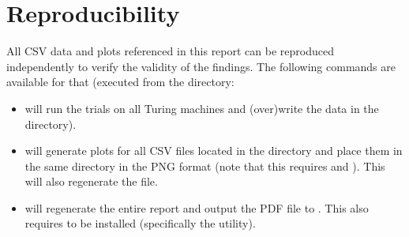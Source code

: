 \section{Reproducibility}

All CSV data and plots referenced in this report can be reproduced independently to verify the validity of the findings. The following commands are available for that (executed from the  directory:

\begin{itemize}
    \item {} will run the trials on all Turing machines and (over)write the data in the  directory).
    \item {} will generate plots for all CSV files located in the  directory and place them in the same directory in the PNG format (note that this requires  and ). This will also regenerate the  file.
    \item {} will regenerate the entire report and output the PDF file to . This also requires  to be installed (specifically the  utility).
\end{itemize}